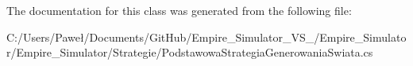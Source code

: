 The documentation for this class was generated from the following file\+:\begin{DoxyCompactItemize}
\item 
C\+:/\+Users/\+Paweł/\+Documents/\+Git\+Hub/\+Empire\+\_\+\+Simulator\+\_\+\+V\+S\+\_/\+Empire\+\_\+\+Simulator/\+Empire\+\_\+\+Simulator/\+Strategie/Podstawowa\+Strategia\+Generowania\+Swiata.\+cs\end{DoxyCompactItemize}
